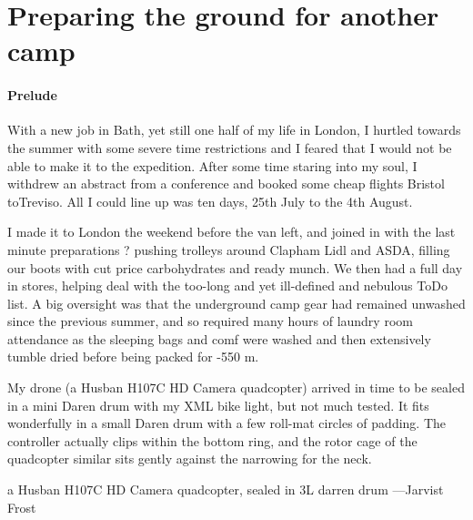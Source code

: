 \begin{marginfigure}
\end{marginfigure}

\section{Preparing the ground for another camp}

\paragraph{Prelude}
With a new job in Bath, yet still one half of my life in London, I hurtled towards the summer with some severe time restrictions and I feared that I would not be able to make it to the expedition. After some time staring into my soul, I withdrew an abstract from a conference and booked some cheap flights Bristol toTreviso. All I could line up was ten days, 25th July to the 4th August.

I made it to London the weekend before the van left, and joined in with the last minute preparations ? pushing trolleys around Clapham Lidl and ASDA, filling our boots with cut price carbohydrates and ready munch. We then had a full day in stores, helping deal with the too-long and yet ill-defined and nebulous ToDo list. A big oversight was that the underground camp gear had remained unwashed since the previous summer, and so required many hours of laundry room attendance as the sleeping bags and comf were washed and then extensively tumble dried before being packed for -550 m.

My drone (a Husban H107C HD Camera quadcopter) arrived in time to be sealed in a mini Daren drum with my XML bike light, but not much tested. It fits wonderfully in a small Daren drum with a few roll-mat circles of padding. The controller actually clips within the bottom ring, and the rotor cage of the quadcopter similar sits gently against the narrowing for the neck.
\begin{marginfigure}
\checkoddpage \ifoddpage \forcerectofloat \else \forceversofloat \fi
\centering
 \caption{a Husban H107C HD Camera quadcopter, sealed in 3L darren drum ---Jarvist Frost}
 \label{quadcopter}
\end{marginfigure}

